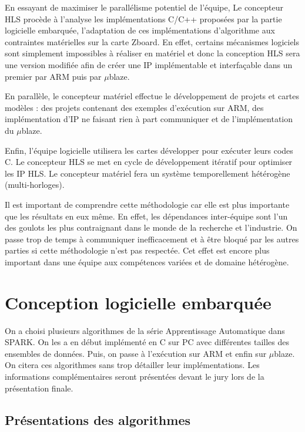 \documentclass[12pt,a4paper]{ieee}
\begin{document}
En essayant de maximiser le parallélisme potentiel de l'équipe, Le concepteur HLS procède à l'analyse les implémentations C/C++ proposées par la partie logicielle embarquée, l'adaptation de ces implémentations d'algorithme aux contraintes matérielles sur la carte Zboard. En effet, certains mécanismes logiciels sont simplement impossibles à réaliser en matériel et donc la conception HLS sera une version modifiée afin de créer une IP implémentable et interfaçable dans un premier par ARM puis par $\mu$blaze.

En parallèle, le concepteur matériel effectue le développement de projets et cartes modèles : des projets contenant des exemples d'exécution sur ARM, des implémentation d'IP ne faisant rien à part communiquer et de l'implémentation du $\mu$blaze.

Enfin, l'équipe logicielle utilisera les cartes développer pour exécuter leurs codes C. Le concepteur HLS se met en cycle de développement itératif pour optimiser les IP HLS. Le concepteur matériel fera un système temporellement hétérogène (multi-horloges).

Il est important de comprendre cette méthodologie car elle est plus importante que les résultats en eux même. En effet, les dépendances inter-équipe sont l'un des goulots les plus contraignant dans le monde de la recherche et l'industrie. On passe trop de temps à communiquer inefficacement et à être bloqué par les autres parties si cette méthodologie n'est pas respectée. Cet effet est encore plus important dans une équipe aux compétences variées et de domaine hétérogène.

\section{Conception logicielle embarquée}
On a choisi plusieurs algorithmes de la série Apprentissage Automatique dans SPARK. On les a en début implémenté en C sur PC avec différentes tailles des ensembles de données. Puis, on passe à l'exécution sur ARM et enfin sur $\mu$blaze. On citera ces algorithmes sans trop détailler leur implémentations. Les informations complémentaires seront présentées devant le jury lors de la présentation finale.

\subsection{Présentations des algorithmes}
\end{document}
